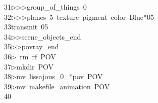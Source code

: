 \begin{tabbing}
31\>$\triangleright$\>$\triangleright$\>$\triangleright$\>group\_of\_things\ 0\ \\[0pt]
32\>$\triangleright$\>$\triangleright$\>$\triangleright$\>planes\ 5\ texture\ pigment\ color\ Blue*05\ \\[0pt]
33\>transmit\ 05\ \ \ \\[0pt]
34\>$\triangleright$\>$\triangleright$\>scene\_objects\_end\ \\[0pt]
35\>$\triangleright$\>$\triangleright$\>povray\_end\\[0pt]
36\>$\triangleright$\>\ rm\ rf\ POV\\[0pt]
37\>$\triangleright$\>mkdir\ POV\\[0pt]
38\>$\triangleright$\>mv\ lissajous\_0\_*pov\ POV\\[0pt]
39\>$\triangleright$\>mv\ makefile\_animation\ POV\\[0pt]
40\>\end{tabbing}
